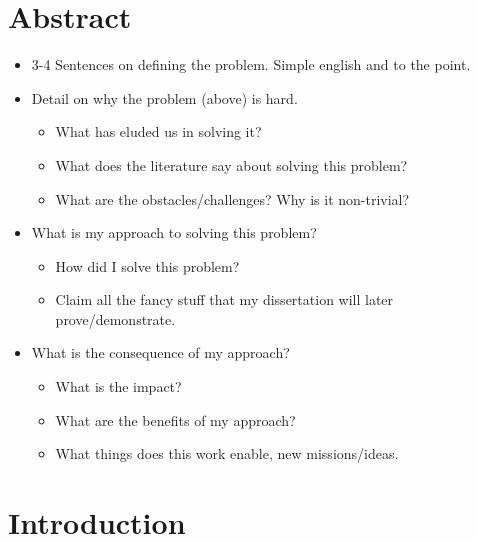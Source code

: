 
\chapter{Abstract}
\begin{itemize}
    \item 3-4 Sentences on defining the problem.
        Simple english and to the point.
    \item Detail on why the problem (above) is hard.
        \begin{itemize}
            \item What has eluded us in solving it?
            \item What does the literature say about solving this problem?
            \item What are the obstacles/challenges? Why is it non-trivial?
        \end{itemize}
    \item What is my approach to solving this problem?
        \begin{itemize}
            \item How did I solve this problem?
            \item Claim all the fancy stuff that my dissertation will later prove/demonstrate.
        \end{itemize}
    \item What is the consequence of my approach?
        \begin{itemize}
            \item What is the impact?
            \item What are the benefits of my approach?
            \item What things does this work enable, new missions/ideas.
        \end{itemize}
\end{itemize}

\chapter{Introduction}

